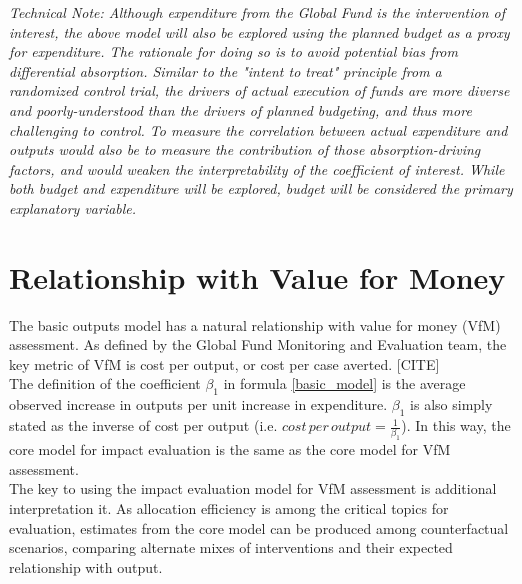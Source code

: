 \documentclass[twocolumn]{bmcart}%
\begin{document}
\textit{Technical Note: Although expenditure from the Global Fund is the intervention of interest, the above model will also be explored using the planned budget as a proxy for expenditure. The rationale for doing so is to avoid potential bias from differential absorption. Similar to the "intent to treat" principle from a randomized control trial, the drivers of actual execution of funds are more diverse and poorly-understood than the drivers of planned budgeting, and thus more challenging to control. To measure the correlation between actual expenditure and outputs would also be to measure the contribution of those absorption-driving factors, and would weaken the interpretability of the coefficient of interest. While both budget and expenditure will be explored, budget will be considered the primary explanatory variable.}


\section{Relationship with Value for Money} \label{vfm}
The basic outputs model has a natural relationship with value for money (VfM) assessment. As defined by the Global Fund Monitoring and Evaluation team, the key metric of VfM is cost per output, or cost per case averted. [CITE] \\

The definition of the coefficient $\beta_1$ in formula \ref{basic_model} is the average observed increase in outputs per unit increase in expenditure. $\beta_1$ is also simply stated as the inverse of cost per output (i.e. $cost\, per\, output = \frac{1}{\beta_1}$). In this way, the core model for impact evaluation is the same as the core model for VfM assessment. \\

The key to using the impact evaluation model for VfM assessment is additional interpretation it. As allocation efficiency is among the critical topics for evaluation, estimates from the core model can be produced among counterfactual scenarios, comparing alternate mixes of interventions and their expected relationship with output.


\end{document}
